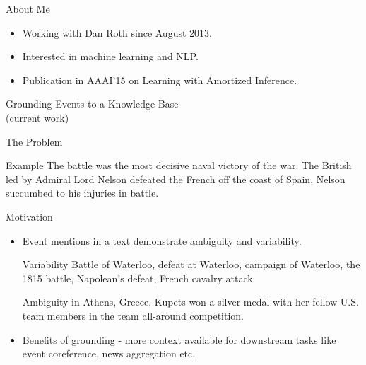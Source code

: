 \begin{frame}{About Me}
  \begin{itemize}
  \item Working with Dan Roth since August 2013.
  \item Interested in machine learning and NLP.
  \item Publication in AAAI'15 on Learning with Amortized Inference.
  \end{itemize}
\end{frame}

\begin{frame}
  \begin{center}
    {
      \huge Grounding Events to a Knowledge Base
    } \\
    (current work)
  \end{center}
\end{frame}


\begin{frame}{The Problem}

  \begin{exampleblock}{Example}
      The { battle} was the most decisive naval victory of the {war}. The British led by Admiral Lord Nelson defeated the French off the coast of Spain. Nelson succumbed to his injuries in battle.
      \end{exampleblock}
  \end{frame}
\begin{frame}{Motivation}
  \begin{itemize}[<+->]
  \item Event mentions in a text demonstrate ambiguity and variability.
    \begin{exampleblock}{Variability}
      {Battle of Waterloo, defeat at Waterloo, campaign of Waterloo, the 1815 battle, Napolean's defeat, French cavalry attack}
    \end{exampleblock}

    \begin{exampleblock}{Ambiguity}
      { in Athens, Greece, Kupets won a silver medal with her fellow U.S. team members in the team all-around competition.}
    \end{exampleblock}
  \item Benefits of grounding - more context available for downstream tasks like event coreference, news aggregation etc.
  \end{itemize}
\end{frame}


